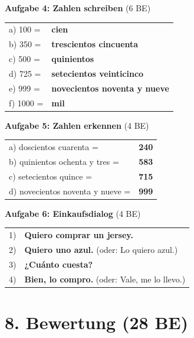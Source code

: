 \documentclass[11pt, a4paper]{article}
\newcommand{\loesung}[1]{\textcolor{loesung}{\textbf{#1}}}
\begin{document}
\textbf{Aufgabe 4: Zahlen schreiben} (6 BE)

\begin{tabular}{ll}
a) 100 = & \loesung{cien} \\
b) 350 = & \loesung{trescientos cincuenta} \\
c) 500 = & \loesung{quinientos} \\
d) 725 = & \loesung{setecientos veinticinco} \\
e) 999 = & \loesung{novecientos noventa y nueve} \\
f) 1000 = & \loesung{mil} \\
\end{tabular}

\vspace{0.8em}

\textbf{Aufgabe 5: Zahlen erkennen} (4 BE)

\begin{tabular}{ll}
a) doscientos cuarenta = & \loesung{240} \\
b) quinientos ochenta y tres = & \loesung{583} \\
c) setecientos quince = & \loesung{715} \\
d) novecientos noventa y nueve = & \loesung{999} \\
\end{tabular}

\vspace{0.8em}

\textbf{Aufgabe 6: Einkaufsdialog} (4 BE)

\begin{tabular}{ll}
1) & \loesung{Quiero comprar un jersey.} \\
2) & \loesung{Quiero uno azul.} (oder: Lo quiero azul.) \\
3) & \loesung{¿Cuánto cuesta?} \\
4) & \loesung{Bien, lo compro.} (oder: Vale, me lo llevo.) \\
\end{tabular}


\section*{8. Bewertung (28 BE)}
\end{document}
